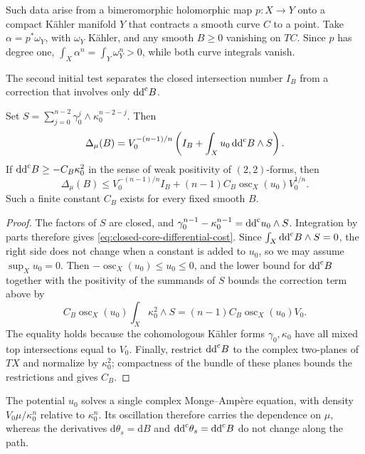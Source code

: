 Such data arise from a bimeromorphic holomorphic map $p\colon X\to Y$ onto a compact K\"ahler manifold $Y$ that contracts a smooth curve $C$ to a point. Take $\alpha=p^*\omega_Y$, with $\omega_Y$ K\"ahler, and any smooth $B\geq0$ vanishing on $TC$. Since $p$ has degree one, $\int_X\alpha^n=\int_Y\omega_Y^n>0$, while both curve integrals vanish.

The second initial test separates the closed intersection number $I_B$ from a correction that involves only $\mathrm{dd}^{\mathrm{c}} B$.

\begin{proposition}\label{prop:closed-core-differential-cost}
Set $S=\sum_{j=0}^{n-2}\gamma_0^j\wedge\kappa_0^{n-2-j}$. Then
\begin{equation}\label{eq:closed-core-differential-cost}
 \Delta_\mu(B)=V_0^{-(n-1)/n}
       \left(I_B+\int_Xu_0\,\mathrm{dd}^{\mathrm{c}} B\wedge S\right).
\end{equation}
If $\mathrm{dd}^{\mathrm{c}} B\geq-C_B\kappa_0^2$ in the sense of weak positivity of $(2,2)$-forms, then
\[
 \Delta_\mu(B)\leq V_0^{-(n-1)/n}I_B
       +(n-1)C_B\operatorname{osc}_X(u_0)V_0^{1/n}.
\]
Such a finite constant $C_B$ exists for every fixed smooth $B$.
\end{proposition}
\begin{proof}
The factors of $S$ are closed, and
$\gamma_0^{n-1}-\kappa_0^{n-1}=\mathrm{dd}^{\mathrm{c}} u_0\wedge S$.
Integration by parts therefore gives \eqref{eq:closed-core-differential-cost}. Since $\int_X\mathrm{dd}^{\mathrm{c}} B\wedge S=0$, the right side does not change when a constant is added to $u_0$, so we may assume $\sup_Xu_0=0$. Then $-\operatorname{osc}_X(u_0)\leq u_0\leq0$, and the lower bound for $\mathrm{dd}^{\mathrm{c}} B$ together with the positivity of the summands of $S$ bounds the correction term above by
\[
 C_B\operatorname{osc}_X(u_0)\int_X\kappa_0^2\wedge S
       =(n-1)C_B\operatorname{osc}_X(u_0)V_0.
\]
The equality holds because the cohomologous K\"ahler forms $\gamma_0,\kappa_0$ have all mixed top intersections equal to $V_0$. Finally, restrict $\mathrm{dd}^{\mathrm{c}} B$ to the complex two-planes of $TX$ and normalize by $\kappa_0^2$; compactness of the bundle of these planes bounds the restrictions and gives $C_B$.
\end{proof}

The potential $u_0$ solves a single complex Monge--Amp\`ere equation, with density $V_0\mu/\kappa_0^n$ relative to $\kappa_0^n$. Its oscillation therefore carries the dependence on $\mu$, whereas the derivatives $\mathrm{d}\theta_s=\mathrm{d}B$ and $\mathrm{dd}^{\mathrm{c}}\theta_s=\mathrm{dd}^{\mathrm{c}} B$ do not change along the path.

